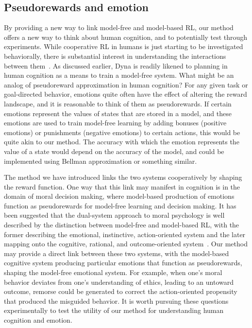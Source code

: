 \documentclass[letterpaper]{article}
\begin{document}
\subsection{Pseudorewards and emotion}

By providing a new way to link model-free and model-based RL, our method offers a new way to think about human cognition, and to potentially test through experiments. While cooperative RL in humans is just starting to be investigated behaviorally, there is substantial interest in understanding the interactions between them~\cite{daw2014algorithmic}. As discussed earlier, Dyna is readily likened to planning in human cognition as a means to train a model-free system. What might be an analog of pseudoreward approximation in human cognition? For any given task or goal-directed behavior, emotions quite often have the effect of altering the reward landscape, and it is reasonable to think of them as pseudorewards. If certain emotions represent the values of states that are stored in a model, and these emotions are used to train model-free learning by adding bonuses (positive emotions) or punishments (negative emotions) to certain actions, this would be quite akin to our method. The accuracy with which the emotion represents the value of a state would depend on the accuracy of the model, and could be implemented using Bellman approximation or something similar.

The method we have introduced links the two systems cooperatively by shaping the reward function. One way that this link may manifest in cognition is in the domain of moral decision making, where model-based production of emotions function as pseudorewards for model-free learning and decision making. It has been suggested that the dual-system approach to moral psychology is well described by the distinction between model-free and model-based RL, with the former describing the emotional, instinctive, action-oriented system and the later mapping onto the cognitive, rational, and outcome-oriented system~\cite{cushman2013action, crockett2013models}. Our method may provide a direct link between these two systems, with the model-based cognitive system producing particular emotions that function as pseudorewards, shaping the model-free emotional system. For example, when one's moral behavior deviates from one's understanding of ethics, leading to an untoward outcome, remorse could be generated to correct the action-oriented propensity that produced the misguided behavior. It is worth pursuing these questions experimentally to test the utility of our method for understanding human cognition and emotion.

{}

\end{document}
